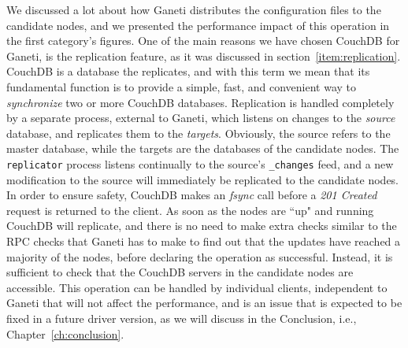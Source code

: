 We discussed a lot about how Ganeti distributes the configuration files
to the candidate nodes, and we presented the performance impact of this
operation in the first category's figures. One of the main reasons we have
chosen CouchDB for Ganeti, is the replication feature, as it was discussed in
section~\ref{item:replication}. CouchDB is a database the replicates, and with
this term we mean that its fundamental function is to provide a simple, fast,
and convenient way to \emph{synchronize} two or more CouchDB databases.
Replication is handled completely by a separate process, external to Ganeti,
which listens on changes to the \emph{source} database, and replicates them to
the \emph{targets}. Obviously, the source refers to the master database, while
the targets are the databases of the candidate nodes. The \texttt{replicator}
process listens continually to the source's \texttt{\_changes} feed, and a new
modification to the source will immediately be replicated to the candidate
nodes. In order to ensure safety, CouchDB makes an \emph{fsync} call before a
\emph{201 Created} request is returned to the client. As soon as the
nodes are ``up" and running CouchDB will replicate, and there is no need to make
extra checks similar to the RPC checks that Ganeti has to make to find out that
the updates have reached a majority of the nodes, before declaring the
operation as successful. Instead, it is sufficient to check that the CouchDB
servers in the candidate nodes are accessible. This operation can be handled by
individual clients, independent to Ganeti that will not affect the performance,
and is an issue that is expected to be fixed in a future driver version, as we
will discuss in the Conclusion, i.e., Chapter~\ref{ch:conclusion}.

